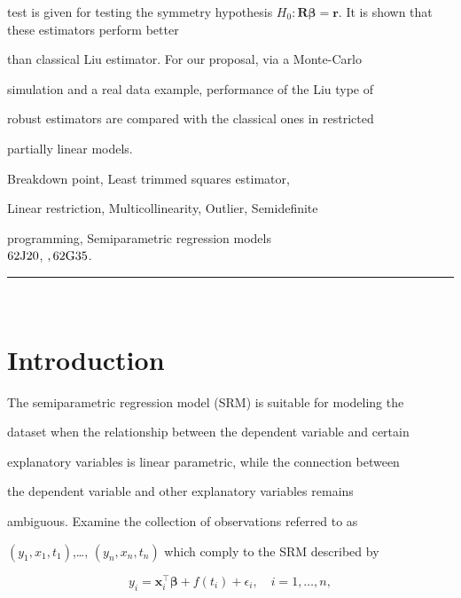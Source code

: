 \documentclass[10pt,twoside]{article}
\numberwithin{equation}{section}
\begin{document}
test is given for testing the symmetry hypothesis $H_0: \boldsymbol R\boldsymbol\beta= \boldsymbol r$. It is shown that these estimators perform better

than classical Liu estimator. For our proposal, via a Monte-Carlo

simulation and a real data example, performance of the Liu type of

robust estimators are compared with the classical ones in restricted

partially linear models.




Breakdown point, Least trimmed squares estimator,

Linear restriction, Multicollinearity, Outlier, Semidefinite

programming, Semiparametric regression models \\

 $\rm 62J20$, $\rm , 62G35$. \\

\hspace{1cm}\rule{\textwidth}{0.2mm}\\


\section{Introduction}

The semiparametric regression model (SRM) is suitable for modeling the

dataset when the relationship between the dependent variable and certain

explanatory variables is linear parametric, while the connection between

the dependent variable and other explanatory variables remains

ambiguous. Examine the collection of observations referred to as

$(y_1,x_{1},t_1)$,\ldots, $(y_n,x_{n},t_n)$ which comply to the SRM described by

\begin{equation}\label{eq11}

y_i=\boldsymbol x_i^\top\boldsymbol \beta+f(t_i)+\epsilon_i,\quad i=1,\ldots,n,

\end{equation}
\end{document}
